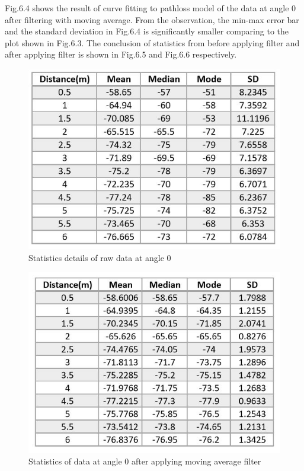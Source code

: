 Fig.6.4 shows the result of curve fitting to pathloss model of the data at angle 0 after filtering with moving average. From the observation, the min-max error bar and the standard deviation in Fig.6.4 is significantly smaller comparing to the plot shown in Fig.6.3. The conclusion of statistics from before applying filter and after applying filter is shown in Fig.6.5 and Fig.6.6 respectively.

\begin{figure}[H]
\centering
\includegraphics[width=\textwidth]{Image/rawTable.JPG}
\caption{Statistics details of raw data at angle 0}
\label{}
\end{figure}

\begin{figure}[H]
\centering
\includegraphics[width=\textwidth]{Image/movAvgTable.JPG}
\caption{Statistics of data at angle 0 after applying moving average filter}
\label{}
\end{figure}



